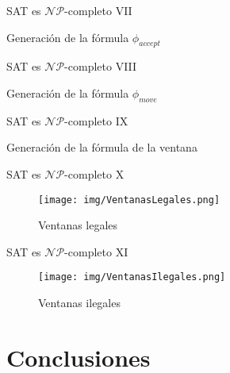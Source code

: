 \documentclass[10pt, mathserif, profesionalfont]{beamer}
\begin{document}
\begin{frame}{SAT es $\mathcal{NP}$-completo VII}

\begin{block}{Generación de la fórmula $\phi_{accept}$}
\end{block}

\end{frame}

\begin{frame}{SAT es $\mathcal{NP}$-completo VIII}

\begin{block}{Generación de la fórmula $\phi_{move}$}
\end{block}

\end{frame}

\begin{frame}{SAT es $\mathcal{NP}$-completo IX}

\begin{block}{Generación de la fórmula de la ventana}
\end{block}

\end{frame}

\begin{frame}{SAT es $\mathcal{NP}$-completo X}

  \begin{figure}[f]
  \texttt{[image: img/VentanasLegales.png]}
  \caption{Ventanas legales}
  \end{figure}

\end{frame}

\begin{frame}{SAT es $\mathcal{NP}$-completo XI}

  \begin{figure}[f]
  \texttt{[image: img/VentanasIlegales.png]}
  \caption{Ventanas ilegales}
  \end{figure}

\end{frame}

\section{Conclusiones}
\end{document}
